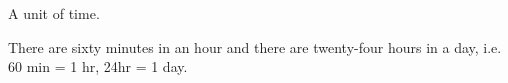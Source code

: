 A unit of time.
\par
There are sixty minutes in an hour and there are twenty-four  hours in a day,
i.e. 60 min = 1 hr,
24hr = 1 day.
